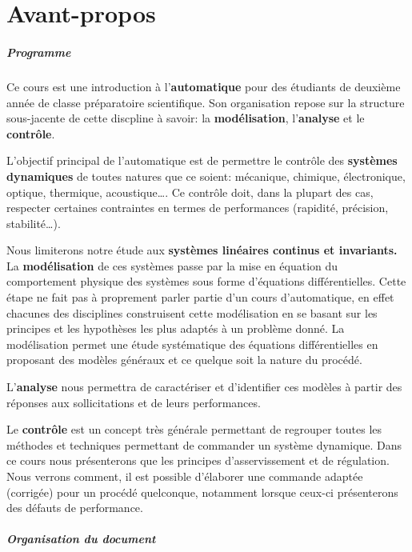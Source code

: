 \chapter*{Avant-propos}

\paragraph{Programme}

Ce cours est une introduction à l'\textbf{automatique}
pour des étudiants de deuxième année de classe préparatoire scientifique.
Son organisation repose sur la structure sous-jacente de cette discpline à savoir: 
la \textbf{modélisation}, l'\textbf{analyse} et 
le \textbf{contrôle}. 

L'objectif principal de l'automatique est de permettre
le contrôle des \textbf{systèmes dynamiques}
de toutes natures que ce soient: mécanique, chimique, 
électronique, optique, thermique, acoustique\ldots.
Ce contrôle doit, dans la plupart des cas, respecter
certaines contraintes en termes de performances (rapidité, précision, stabilité\ldots). 

Nous limiterons notre étude aux \textbf{systèmes linéaires continus et invariants.}
La \textbf{modélisation} de ces systèmes passe par 
la mise en équation du comportement physique des
systèmes sous forme d'équations différentielles.
Cette étape ne fait pas à proprement parler partie d'un cours d'automatique,
en effet chacunes des disciplines construisent cette modélisation 
en se basant sur les principes et les hypothèses les plus adaptés 
à un problème donné.
La modélisation permet une étude systématique des équations
différentielles en proposant des modèles généraux 
et ce quelque soit la nature du procédé.

L'\textbf{analyse} nous permettra de caractériser et d'identifier 
ces modèles à partir des réponses aux sollicitations et de leurs performances.

Le \textbf{contrôle} est un concept très générale permettant de regrouper
toutes les méthodes et techniques permettant de commander un système dynamique.
Dans ce cours nous présenterons que les principes d'asservissement et de régulation.
Nous verrons comment, il est possible d'élaborer une commande adaptée (corrigée) 
pour un procédé quelconque, notamment lorsque ceux-ci présenterons des défauts de performance.


\paragraph{Organisation du document}

